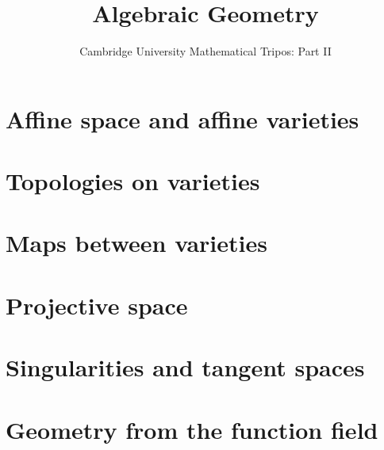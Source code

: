 \documentclass{article}
\title{Algebraic Geometry}
\author{Cambridge University Mathematical Tripos: Part II}
\begin{document}
\maketitle

\tableofcontentsnewpage{}


\section{Affine space and affine varieties}

\section{Topologies on varieties}

\section{Maps between varieties}

\section{Projective space}

\section{Singularities and tangent spaces}

\section{Geometry from the function field}

\end{document}
